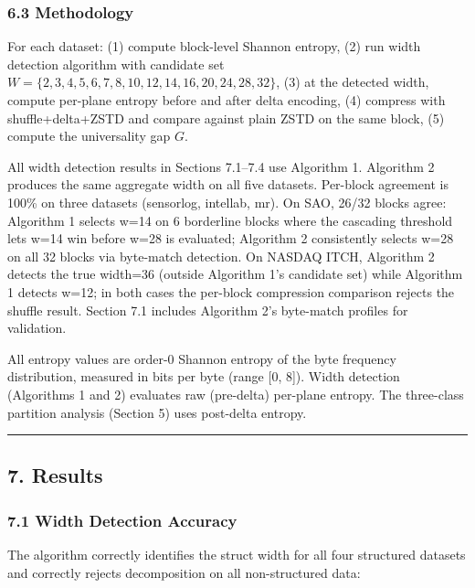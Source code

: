 \documentclass[
  11pt,
  letterpaper,
]{article}
\makeatletter
\renewcommand{\_}{\bpd@origunderscore\allowbreak}
\makeatother
\begin{document}
\hypertarget{methodology}{%
\subsubsection{6.3 Methodology}\label{methodology}}

For each dataset: (1) compute block-level Shannon entropy, (2) run width
detection algorithm with candidate set
\(W = \{2,3,4,5,6,7,8,10,12,14,16,20,24,28,32\}\), (3) at the detected
width, compute per-plane entropy before and after delta encoding, (4)
compress with shuffle+delta+ZSTD and compare against plain ZSTD on the
same block, (5) compute the universality gap \(G\).

All width detection results in Sections 7.1--7.4 use Algorithm 1.
Algorithm 2 produces the same aggregate width on all five datasets.
Per-block agreement is 100\% on three datasets (sensor\_log, intel\_lab,
mr). On SAO, 26/32 blocks agree: Algorithm 1 selects w=14 on 6
borderline blocks where the cascading threshold lets w=14 win before
w=28 is evaluated; Algorithm 2 consistently selects w=28 on all 32
blocks via byte-match detection. On NAS\-DAQ ITCH, Algorithm 2 detects the
true width=36 (outside Algorithm 1's candidate set) while Algorithm 1
detects w=12; in both cases the per-block compression comparison rejects
the shuffle result. Section 7.1 includes Algorithm 2's byte-match
profiles for validation.

All entropy values are order-0 Shannon entropy of the byte frequency
distribution, measured in bits per byte (range {[}0, 8{]}). Width
detection (Algorithms 1 and 2) evaluates raw (pre-delta) per-plane
entropy. The three-class partition analysis (Section 5) uses post-delta
entropy.

\begin{center}\rule{0.5\linewidth}{0.5pt}\end{center}

\hypertarget{results}{%
\subsection{7. Results}\label{results}}

\hypertarget{width-detection-accuracy}{%
\subsubsection{7.1 Width Detection
Accuracy}\label{width-detection-accuracy}}

The algorithm correctly identifies the struct width for all four
structured datasets and correctly rejects decomposition on all
non-structured data:
\end{document}
